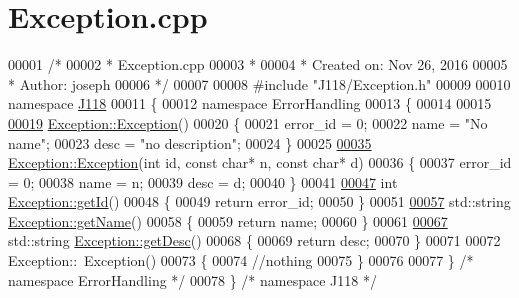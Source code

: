 \hypertarget{_exception_8cpp_source}{}\section{Exception.\+cpp}
\label{_exception_8cpp_source}

\begin{DoxyCode}
00001 \textcolor{comment}{/*}
00002 \textcolor{comment}{ * Exception.cpp}
00003 \textcolor{comment}{ *}
00004 \textcolor{comment}{ *  Created on: Nov 26, 2016}
00005 \textcolor{comment}{ *      Author: joseph}
00006 \textcolor{comment}{ */}
00007 
00008 \textcolor{preprocessor}{#include "J118/Exception.h"}
00009 
00010 \textcolor{keyword}{namespace }\hyperlink{namespace_j118}{J118}
00011 \{
00012 \textcolor{keyword}{namespace }ErrorHandling
00013 \{
00014 
00015 
\hypertarget{_exception_8cpp_source_l00019}{}\hyperlink{class_j118_1_1_error_handling_1_1_exception_ad198efcdbab0bfcc391be37faa902b7c}{00019} \hyperlink{class_j118_1_1_error_handling_1_1_exception_ad198efcdbab0bfcc391be37faa902b7c}{Exception::Exception}()
00020 \{
00021     error\_id = 0;
00022     name = \textcolor{stringliteral}{"No name"};
00023     desc = \textcolor{stringliteral}{"no description"};
00024 \}
00025 
\hypertarget{_exception_8cpp_source_l00035}{}\hyperlink{class_j118_1_1_error_handling_1_1_exception_aa42811d0c39c889bd1b2c4f0b290e3bb}{00035} \hyperlink{class_j118_1_1_error_handling_1_1_exception_ad198efcdbab0bfcc391be37faa902b7c}{Exception::Exception}(\textcolor{keywordtype}{int} \textcolor{keywordtype}{id}, \textcolor{keyword}{const} \textcolor{keywordtype}{char}* n, \textcolor{keyword}{const} \textcolor{keywordtype}{char}* d)
00036 \{
00037     error\_id = 0;
00038     name = n;
00039     desc = d;
00040 \}
00041 
\hypertarget{_exception_8cpp_source_l00047}{}\hyperlink{class_j118_1_1_error_handling_1_1_exception_a23cb87bd08a68063b4631fcb0a0ce813}{00047} \textcolor{keywordtype}{int} \hyperlink{class_j118_1_1_error_handling_1_1_exception_a23cb87bd08a68063b4631fcb0a0ce813}{Exception::getId}()
00048 \{
00049     \textcolor{keywordflow}{return} error\_id;
00050 \}
00051 
\hypertarget{_exception_8cpp_source_l00057}{}\hyperlink{class_j118_1_1_error_handling_1_1_exception_ad60486b9b68b001eb8141a951da92b46}{00057} std::string \hyperlink{class_j118_1_1_error_handling_1_1_exception_ad60486b9b68b001eb8141a951da92b46}{Exception::getName}()
00058 \{
00059     \textcolor{keywordflow}{return} name;
00060 \}
00061 
\hypertarget{_exception_8cpp_source_l00067}{}\hyperlink{class_j118_1_1_error_handling_1_1_exception_a94983c1a3e04e1d2fd3a9db88eadd836}{00067} std::string \hyperlink{class_j118_1_1_error_handling_1_1_exception_a94983c1a3e04e1d2fd3a9db88eadd836}{Exception::getDesc}()
00068 \{
00069     \textcolor{keywordflow}{return} desc;
00070 \}
00071 
00072 Exception::~Exception()
00073 \{
00074     \textcolor{comment}{//nothing}
00075 \}
00076 
00077 \} \textcolor{comment}{/* namespace ErrorHandling */}
00078 \} \textcolor{comment}{/* namespace J118 */}
\end{DoxyCode}
